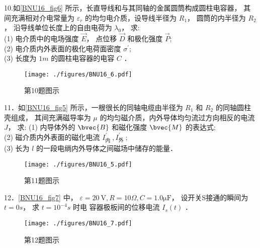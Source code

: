 10.如\autoref{BNU16_fig6} 所示，长直导线和与其同轴的金属圆筒构成圆柱电容器， 其间充满相对介电常量为 $\varepsilon_{r}$ 的均匀电介质，设导线半径为 $R_{1}$， 圆筒的内半径为 $R_{2}$， 沿导线单位长度上的自由电荷为 $\lambda_{0}$， 求:\\
(1) 电介质中的电场强度 $\vec{E}$， 点位移 $\vec{D}$ 和极化强度 $\vec{P}$;\\
(2) 电介质内外表面的极化电荷面密度 $\sigma^{\prime}$;\\
(3) 长度为 $1 m$ 的圆柱电容器的电容 $C$ ．
\begin{figure}[ht]
\centering
\texttt{[image: ./figures/BNU16\_6.pdf]}
\caption{第10题图示} \label{BNU16_fig6}
\end{figure}

11．如\autoref{BNU16_fig5} 所示，一根很长的同轴电缆由半径为 $R_{1}$ 和 $R_{2}$ 的同轴圆柱壳组成， 其间充满磁导率为 $\mu$ 的均匀磁介质，内外导体均匀流过方向相反的电流 $J$， 求:
(1) 内导体外的 $\bvec{B}$ 和磁化强度 $\bvec{M}$ 的表达式;\\
(2) 磁介质内外表面的磁化电流 $I_{\text {内 }}^{\prime}, I_{\text {外 }}^{\prime}$;\\
(3) 长为 $l$ 的一段电绱内外导体之间磁场中储存的能量．
\begin{figure}[ht]
\centering
\texttt{[image: ./figures/BNU16\_5.pdf]}
\caption{第11题图示} \label{BNU16_fig5}
\end{figure}
12．\autoref{BNU16_fig7} 中， $\varepsilon=20 \mathrm{~V}, R=10 \Omega, C=1.0\mathrm{\mu F}$， 设开关S接通的瞬间为 $t=0 s$， 求 $t=10^{-4} s$ 时电 容器极板间的位移电流 $I_{s}(t)$ ．
\begin{figure}[ht]
\centering
\texttt{[image: ./figures/BNU16\_7.pdf]}
\caption{第12题图示} \label{BNU16_fig7}
\end{figure}